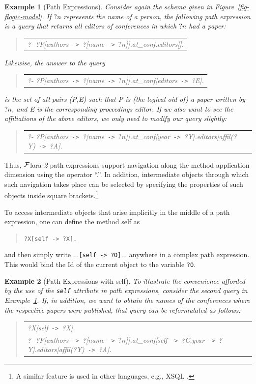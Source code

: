 \documentclass[11pt]{article}
\newcommand{\FLORA}{{\mbox{\sc ${\cal F}${lora}\rm\emph{-2}}}\xspace}
\newcommand{\FLSYSTEM}{\FLORA}
\newtheorem{example}{Example}[section]
\newenvironment{qrules}{\begin{quote}\tt\begin{tabular}[t]{l}}%
{\end{tabular}\end{quote}}
\newcommand{\mvd}{{\mbox{\tt \,->\,}}}  %
\newcommand{\anon}{?}
\begin{document}
\begin{example}[Path Expressions]\label{Ex:PathExpr}
  \rm Consider again the schema given in Figure~\ref{fig-flogic-model}.  If
  $?n$ represents the name of a person, the following path expression is a query
  that returns all editors of conferences in which $?n$ had a paper:
  \begin{qrules}
   ?- ?P[authors\mvd\anon [name\mvd $?n$]].at\_conf.editors[].
  \end{qrules}
  Likewise, the answer to the query
  \begin{qrules}
   ?- ?P[authors\mvd\anon [name\mvd $?n$]].at\_conf[editors\mvd?E].
  \end{qrules}
  is the set of all pairs (\textsf{P},\textsf{E}) such that \textsf{P} is
  (the logical oid of) a paper written by $?n$, and \textsf{E} is the
  corresponding proceedings editor.  If we also want to see the
  affiliations of the above editors, we only need to modify our query
  slightly:
  \begin{qrules}
   ?- ?P[authors\mvd\anon [name\mvd $?n$]].at\_conf[year\mvd ?Y].editors[affil(?Y)\mvd ?A].
  \end{qrules}
\end{example}
Thus, \FLSYSTEM path expressions support navigation 
along the method application dimension using the operator
``.''.
In addition, intermediate objects through which such navigation
takes place can be selected by specifying the properties of such objects
inside square brackets.\footnote{
  A similar feature is used in other languages, e.g., XSQL \cite{xsql-92}.
  }

To access intermediate objects that arise implicitly in the middle
of a path expression, one can define the method \textsf{self} as
\begin{quote}
  {\tt ?X[self{\mvd}?X].} 
\end{quote}
and then simply write $\dots${\tt [self{\mvd}?O]}$\dots$ anywhere in a
complex path expression. This would bind the Id of the current object to
the variable {\tt ?O}.

\begin{example}[Path Expressions with \textsf{self}]\label{ex-path-self}
  \rm{
    To illustrate the convenience afforded by the use of the {\tt self}
    attribute in path expressions, consider the second query in
    Example~\ref{Ex:PathExpr}. If, in addition, we want to obtain the names
    of the conferences where the respective papers were published, that
    query can be reformulated as follows:
    }
  \begin{qrules}
    \hspace*{-12mm}
    ?X[self\mvd ?X].\\
    \hspace*{-12mm}
    ?- ?P[authors\mvd\anon[name\mvd $?n$]].at\_conf[self\mvd ?C,year\mvd ?Y].editors[affil(?Y)\mvd ?A]. 
  \end{qrules}
\end{example}
\end{document}
